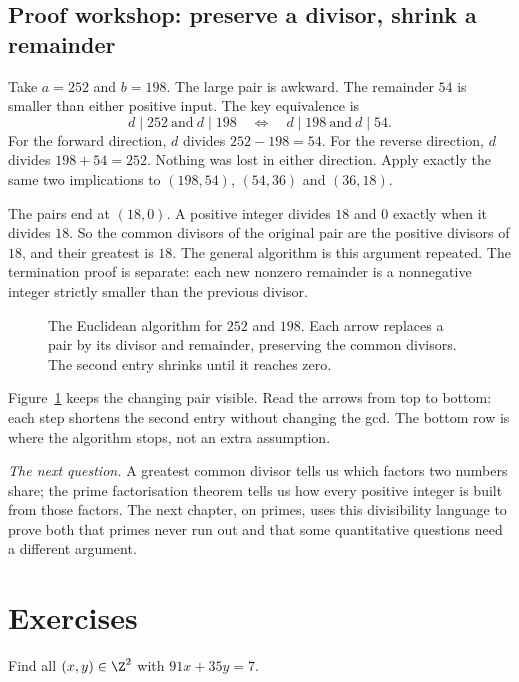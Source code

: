 \subsection*{Proof workshop: preserve a divisor, shrink a remainder}

Take $a=252$ and $b=198$. The large pair is awkward. The remainder $54$
is smaller than either positive input. The key equivalence is
\[
d\mid252\ \text{and}\ d\mid198
\quad\Longleftrightarrow\quad
d\mid198\ \text{and}\ d\mid54.
\]
For the forward direction, $d$ divides $252-198=54$. For the
reverse direction, $d$ divides $198+54=252$. Nothing was lost in
either direction. Apply exactly the same two implications to
$(198,54)$, $(54,36)$ and $(36,18)$.

The pairs end at $(18,0)$. A positive integer divides $18$ and $0$
exactly when it divides $18$. So the common divisors of the original
pair are the positive divisors of $18$, and their greatest is $18$.
The general algorithm is this argument repeated. The termination
proof is separate: each new nonzero remainder is a nonnegative
integer strictly smaller than the previous divisor.

\begin{figure}[ht]
\centering
{}
\caption{The Euclidean algorithm for $252$ and $198$. Each arrow
replaces a pair by its divisor and remainder, preserving the
common divisors. The second entry shrinks until it reaches zero.}
\label{fig:euclid-remainder-staircase}
\end{figure}

Figure~\ref{fig:euclid-remainder-staircase} keeps the changing pair visible. Read the arrows from top to bottom: each step shortens the second entry without changing the gcd. The bottom row is where the algorithm stops, not an extra assumption.


\medskip
\noindent\emph{The next question.} A greatest common divisor tells us which factors two numbers share; the prime factorisation theorem tells us how every positive integer is built from those factors. The next chapter, on primes, uses this divisibility language to prove both that primes never run out and that some quantitative questions need a different argument.

\section{Exercises}

\begin{exercise}[$\star$]\label{ex:bez}
Find all $(x,y)\in\Z^2$ with $91x+35y=7$.
\end{exercise}

